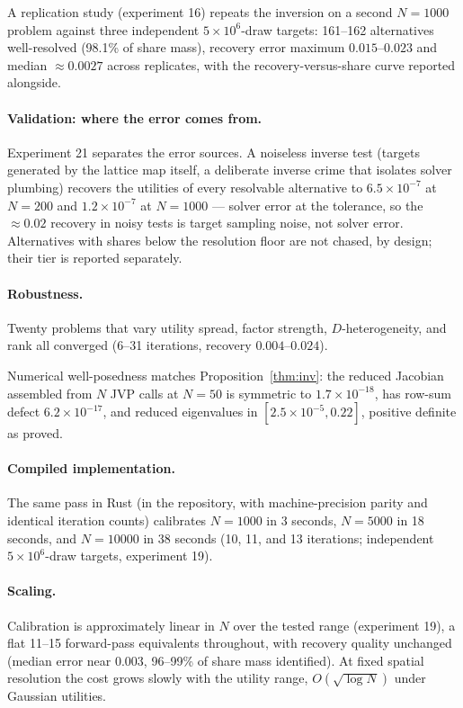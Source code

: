 \documentclass[12pt]{article}
\theoremstyle{remark}
\begin{document}
A replication study (experiment
16) repeats the inversion on a second $N=1000$ problem against three
independent $5\times10^6$-draw targets: 161--162
alternatives well-resolved (98.1\% of share mass), recovery error maximum
$0.015$--$0.023$ and median $\approx 0.0027$ across replicates, with the
recovery-versus-share curve reported alongside.

\paragraph{Validation: where the error comes from.} Experiment 21
separates the error sources. A noiseless inverse
test (targets generated by the lattice map itself, a deliberate inverse
crime that isolates solver plumbing) recovers the utilities of every
resolvable alternative to $6.5\times10^{-7}$ at $N=200$ and
$1.2\times10^{-7}$ at $N=1000$ --- solver error at the tolerance, so the
$\approx 0.02$ recovery in noisy tests is target sampling noise, not
solver error. Alternatives with shares below the resolution floor are not
chased, by design; their tier is reported separately.

\paragraph{Robustness.} Twenty problems that vary utility spread, factor
strength, $D$-heterogeneity, and rank all converged (6--31 iterations, recovery
$0.004$--$0.024$).

Numerical well-posedness matches
Proposition~\ref{thm:inv}: the reduced Jacobian assembled from $N$ JVP calls
at $N=50$ is symmetric to $1.7\times10^{-18}$, has row-sum defect
$6.2\times10^{-17}$, and reduced eigenvalues in $[2.5\times10^{-5},
0.22]$, positive definite as proved.

\paragraph{Compiled implementation.} The same pass in Rust (in the
repository, with machine-precision parity and identical iteration counts)
calibrates $N=1000$ in 3 seconds, $N=5000$ in 18 seconds, and
$N=10000$ in 38 seconds (10, 11, and 13 iterations; independent
$5\times10^6$-draw targets, experiment 19).

\paragraph{Scaling.} Calibration is approximately linear in $N$ over
the tested range (experiment 19), a flat 11--15
forward-pass equivalents throughout, with recovery quality unchanged
(median error near $0.003$, 96--99\% of share mass identified). At fixed
spatial resolution the cost grows slowly with the utility range,
$O(\sqrt{\log N})$ under Gaussian utilities.
\end{document}
